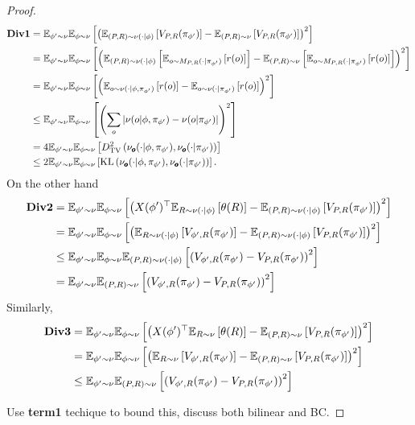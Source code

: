 \begin{proof}
\begin{align*}
    \textbf{Div1} &= \mathbb{E}_{\phi' \sim \nu}\mathbb{E}_{\phi \sim \nu}\left[\left(\mathbb{E}_{(P,R) \sim \nu(\cdot|\phi)}\left[V_{P,R}(\pi_{\phi'})\right] - \mathbb{E}_{(P,R) \sim \nu}\left[V_{P,R}(\pi_{\phi'})\right]\right)^2\right]
    \\&= \mathbb{E}_{\phi' \sim \nu}\mathbb{E}_{\phi \sim \nu}\left[\left(\mathbb{E}_{(P,R) \sim \nu(\cdot|\phi)}\left[\mathbb{E}_{o \sim M_{P,R}(\cdot|\pi_{\phi'})}\left[r(o)\right]\right] - \mathbb{E}_{(P,R) \sim \nu}\left[\mathbb{E}_{o \sim M_{P,R}(\cdot|\pi_{\phi'})}\left[r(o)\right]\right]\right)^2\right]
    \\&= \mathbb{E}_{\phi' \sim \nu}\mathbb{E}_{\phi \sim \nu}\left[\left(\mathbb{E}_{o \sim \nu(\cdot|\phi, \pi_{\phi'})}\left[r(o)\right] - \mathbb{E}_{o \sim \nu(\cdot|\pi_{\phi'})}\left[r(o)\right] \right)^2\right]
    \\&\le \mathbb{E}_{\phi' \sim \nu}\mathbb{E}_{\phi \sim \nu}\left[\left(\sum_{o}\left|\nu(o|\phi, \pi_{\phi'}) - \nu(o|\pi_{\phi'}) \right|\right)^2\right]
    \\&= 4\mathbb{E}_{\phi' \sim \nu}\mathbb{E}_{\phi \sim \nu}\left[D_{\text{TV}}^2\left(\nu_{\pmb{o}}(\cdot|\phi, \pi_{\phi'}), \nu_{\pmb{o}}(\cdot|\pi_{\phi'}) \right)\right] 
    \\&\le 2\mathbb{E}_{\phi' \sim \nu}\mathbb{E}_{\phi \sim \nu}\left[\text{KL}\left(\nu_{\pmb{o}}(\cdot|\phi, \pi_{\phi'}), \nu_{\pmb{o}}(\cdot|\pi_{\phi'}) \right)\right].
\end{align*}
On the other hand
\begin{align*}
     \textbf{Div2} &= \mathbb{E}_{\phi' \sim \nu}\mathbb{E}_{\phi \sim \nu}\left[\left(X(\phi')^\top\mathbb{E}_{R \sim \nu(\cdot|\phi)}\left[\theta(R)\right] - \mathbb{E}_{(P,R) \sim \nu(\cdot|\phi)}\left[V_{P,R}(\pi_{\phi'})\right] \right)^2\right]
     \\&= \mathbb{E}_{\phi' \sim \nu}\mathbb{E}_{\phi \sim \nu}\left[\left(\mathbb{E}_{R \sim \nu(\cdot|\phi)}\left[V_{\phi', R}(\pi_{\phi'})\right] - \mathbb{E}_{(P,R) \sim \nu(\cdot|\phi)}\left[V_{P,R}(\pi_{\phi'})\right] \right)^2\right]
     \\&\le \mathbb{E}_{\phi' \sim \nu}\mathbb{E}_{\phi \sim \nu}\mathbb{E}_{(P,R) \sim \nu(\cdot|\phi)}\left[\left(V_{\phi', R}(\pi_{\phi'}) - V_{P,R}(\pi_{\phi'}) \right)^2\right]
     \\&= \mathbb{E}_{\phi' \sim \nu}\mathbb{E}_{(P,R) \sim \nu}\left[\left(V_{\phi', R}(\pi_{\phi'}) - V_{P,R}(\pi_{\phi'}) \right)^2\right]
\end{align*}
Similarly,
\begin{align*}
     \textbf{Div3} &= \mathbb{E}_{\phi' \sim \nu}\mathbb{E}_{\phi \sim \nu}\left[\left(X(\phi')^\top\mathbb{E}_{R \sim \nu}\left[\theta(R)\right] - \mathbb{E}_{(P,R) \sim \nu}\left[V_{P,R}(\pi_{\phi'})\right] \right)^2\right]
     \\&= \mathbb{E}_{\phi' \sim \nu}\mathbb{E}_{\phi \sim \nu}\left[\left(\mathbb{E}_{R \sim \nu}\left[V_{\phi', R}(\pi_{\phi'})\right] - \mathbb{E}_{(P,R) \sim \nu}\left[V_{P,R}(\pi_{\phi'})\right] \right)^2\right]
     \\&\le \mathbb{E}_{\phi' \sim \nu}\mathbb{E}_{(P,R) \sim \nu}\left[\left(V_{\phi', R}(\pi_{\phi'}) - V_{P,R}(\pi_{\phi'}) \right)^2\right]
\end{align*}

Use \textbf{term1} techique to bound this, discuss both bilinear and BC.
\end{proof}
\fi



